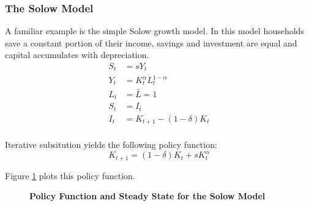 \documentclass[letterpaper,12pt]{article}
\theoremstyle{definition}
\begin{document}
\begin{spacing}{1.5}
		\subsubsection{The Solow Model}\label{DSGE_SS_Solow}
			A familiar example is the simple Solow growth model. In this model households save a constant portion of their income, savings and investment are equal and capital accumulates with depreciation.
			\begin{equation}
			\begin{split}
			S_t & = s Y_t \\
			Y_t & = K_t^\alpha L_t^{1-\alpha} \\
			L_t & = \bar L = 1 \\
			S_t & = I_t \\
			I_t & = K_{t+1} -(1-\delta)K_t \\ \nonumber
			\end{split}
			\end{equation}

			Iterative subsitution yields the following policy function:
			\begin{equation}
			 K_{t+1} = (1-\delta)K_t  + s K_t^\alpha
			\end{equation}

			Figure \ref{DSGE_Solow1_Fig} plots this policy function.
			\begin{figure}[htb]\centering \captionsetup{width=4.0in}
			   \caption{\label{DSGE_Solow1_Fig}\textbf{Policy Function and Steady State for the Solow Model}}
			\end{figure}


\end{spacing}
\end{document}
